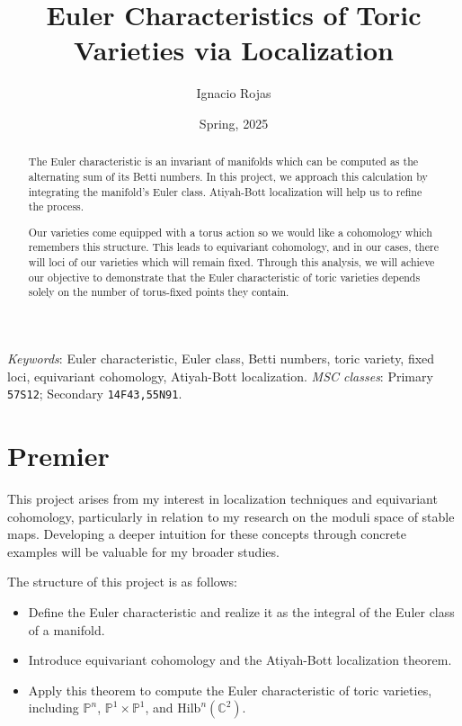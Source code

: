 \documentclass[12pt]{memoir}
\title{Euler Characteristics of Toric Varieties via Localization}
\author{Ignacio Rojas}
\date{Spring, 2025}
\begin{document}
\bgroup
\renewcommand\thesection{\arabic{section}}
\renewcommand{\thefigure}{\arabic{figure}}
\maketitle

\begin{abstract}
    The Euler characteristic is an invariant of manifolds which can be computed as the alternating sum of its Betti numbers. In this project, we approach this calculation by integrating the manifold's Euler class. Atiyah-Bott localization will help us to refine the process.\par
    Our varieties come equipped with a torus action so we would like a cohomology which remembers this structure. This leads to equivariant cohomology, and in our cases, there will loci of our varieties which will remain fixed. Through this analysis, we will achieve our objective to demonstrate that the Euler characteristic of toric varieties depends solely on the number of torus-fixed points they contain.
    \end{abstract}
    \smallskip
    \begin{flushleft}
        \small
        \emph{Keywords}: Euler characteristic, Euler class, Betti numbers, toric variety, fixed loci, equivariant cohomology, Atiyah-Bott localization.
       \emph{MSC classes}:  Primary \texttt{57S12}; Secondary \texttt{14F43,55N91}.
    \end{flushleft}
    \section{Premier}
    
    This project arises from my interest in localization techniques and equivariant cohomology, particularly in relation to my research on the moduli space of stable maps. Developing a deeper intuition for these concepts through concrete examples will be valuable for my broader studies.
    
    The structure of this project is as follows:
    \begin{itemize}
        \item Define the Euler characteristic and realize it as the integral of the Euler class of a manifold.
        \item Introduce equivariant cohomology and the Atiyah-Bott localization theorem.
        \item Apply this theorem to compute the Euler characteristic of toric varieties, including $\mathbb{P}^n$, $\mathbb{P}^1 \times \mathbb{P}^1$, and $\text{Hilb}^n(\mathbb{C}^2)$.
    \end{itemize}
    
\end{document}
